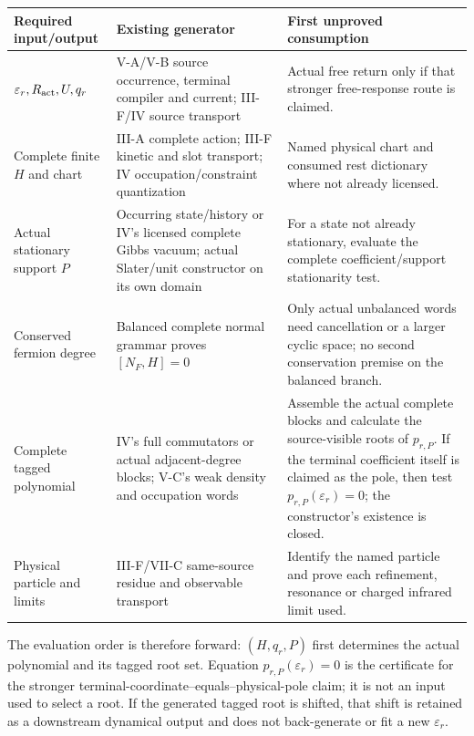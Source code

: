 \documentclass[12pt,a4paper]{article}
\begin{document}
\begin{center}
\begin{tabular}{p{}p{}p{}}
\textbf{Required input/output}&\textbf{Existing generator}&\textbf{First unproved consumption}\\\hline
$\varepsilon_r,R_{\rm act},U,q_r$
&V-A/V-B source occurrence, terminal compiler and current; III-F/IV source transport
&Actual free return only if that stronger free-response route is claimed.\\
Complete finite $H$ and chart
&III-A complete action; III-F kinetic and slot transport; IV occupation/constraint quantization
&Named physical chart and consumed rest dictionary where not already licensed.\\
Actual stationary support $P$
&Occurring state/history or IV's licensed complete Gibbs vacuum; actual Slater/unit constructor on its own domain
&For a state not already stationary, evaluate the complete coefficient/support stationarity test.\\
Conserved fermion degree
&Balanced complete normal grammar proves $[N_F,H]=0$
&Only actual unbalanced words need cancellation or a larger cyclic space; no second conservation premise on the balanced branch.\\
Complete tagged polynomial
&IV's full commutators or actual adjacent-degree blocks; V-C's weak density and occupation words
&Assemble the actual complete blocks and calculate the source-visible roots of $p_{r,P}$.  If the terminal coefficient itself is claimed as the pole, then test $p_{r,P}(\varepsilon_r)=0$; the constructor's existence is closed.\\
Physical particle and limits
&III-F/VII-C same-source residue and observable transport
&Identify the named particle and prove each refinement, resonance or charged infrared limit used.
\end{tabular}
\end{center}


The evaluation order is therefore forward: $(H,q_r,P)$ first determines the
actual polynomial and its tagged root set.  Equation
$p_{r,P}(\varepsilon_r)=0$ is the certificate for the stronger
terminal-coordinate--equals--physical-pole claim; it is not an input used to
select a root.  If the generated tagged root is shifted, that shift is retained
as a downstream dynamical output and does not back-generate or fit a new
$\varepsilon_r$.
\end{document}
